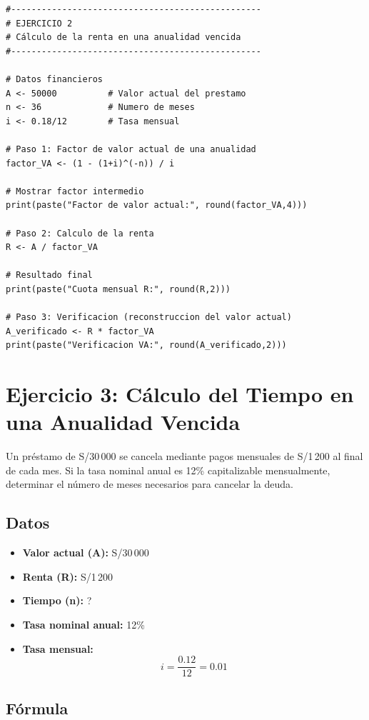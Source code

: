 \documentclass[12pt]{article}
\begin{document}
\begin{lstlisting}
#-------------------------------------------------
# EJERCICIO 2
# Cálculo de la renta en una anualidad vencida
#-------------------------------------------------

# Datos financieros
A <- 50000          # Valor actual del prestamo
n <- 36             # Numero de meses
i <- 0.18/12        # Tasa mensual

# Paso 1: Factor de valor actual de una anualidad
factor_VA <- (1 - (1+i)^(-n)) / i

# Mostrar factor intermedio
print(paste("Factor de valor actual:", round(factor_VA,4)))

# Paso 2: Calculo de la renta
R <- A / factor_VA

# Resultado final
print(paste("Cuota mensual R:", round(R,2)))

# Paso 3: Verificacion (reconstruccion del valor actual)
A_verificado <- R * factor_VA
print(paste("Verificacion VA:", round(A_verificado,2)))

\end{lstlisting}

\section*{Ejercicio 3: Cálculo del Tiempo en una Anualidad Vencida}

Un préstamo de S/30\,000 se cancela mediante pagos mensuales de S/1\,200 al final de cada mes. Si la tasa nominal anual es 12\% capitalizable mensualmente, determinar el número de meses necesarios para cancelar la deuda.

\subsection*{Datos}

\begin{itemize}
\item \textbf{Valor actual (A):} S/30\,000
\item \textbf{Renta (R):} S/1\,200
\item \textbf{Tiempo (n):} ?
\item \textbf{Tasa nominal anual:} 12\%
\item \textbf{Tasa mensual:}
\[
i = \frac{0.12}{12} = 0.01
\]
\end{itemize}

\subsection*{Fórmula}
\end{document}
